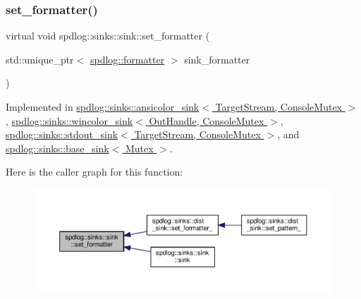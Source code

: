 \subsubsection{\texorpdfstring{set\+\_\+formatter()}{set\_formatter()}}
{\footnotesize\ttfamily virtual void spdlog\+::sinks\+::sink\+::set\+\_\+formatter (\begin{DoxyParamCaption}\item[{std\+::unique\+\_\+ptr$<$ \hyperlink{classspdlog_1_1formatter}{spdlog\+::formatter} $>$}]{sink\+\_\+formatter }\end{DoxyParamCaption})\hspace{0.3cm}{\ttfamily [pure virtual]}}



Implemented in \hyperlink{classspdlog_1_1sinks_1_1ansicolor__sink_a030c3495398d4f320ad444ca940b4731}{spdlog\+::sinks\+::ansicolor\+\_\+sink$<$ Target\+Stream, Console\+Mutex $>$}, \hyperlink{classspdlog_1_1sinks_1_1wincolor__sink_a48cc1a252565bdbb66b12ba2a40e62f9}{spdlog\+::sinks\+::wincolor\+\_\+sink$<$ Out\+Handle, Console\+Mutex $>$}, \hyperlink{classspdlog_1_1sinks_1_1stdout__sink_ada2b3ef5a7821873df46ebda72b77e6c}{spdlog\+::sinks\+::stdout\+\_\+sink$<$ Target\+Stream, Console\+Mutex $>$}, and \hyperlink{classspdlog_1_1sinks_1_1base__sink_ad66435c2e9e0adb06ee279dde88a2243}{spdlog\+::sinks\+::base\+\_\+sink$<$ Mutex $>$}.

Here is the caller graph for this function\+:
\nopagebreak
\begin{figure}[H]
\begin{center}
\leavevmode
\includegraphics[width=350pt]{classspdlog_1_1sinks_1_1sink_ac410f2229e583a75337a5fdf45d020be_icgraph}
\end{center}
\end{figure}
\mbox{\label{classspdlog_1_1sinks_1_1sink_a038a91409395dca18a7ccca81622fd83}} 

